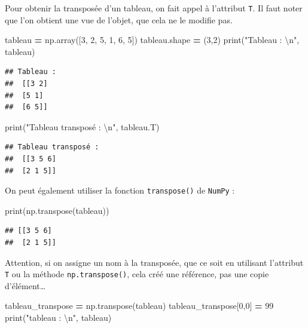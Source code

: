 \documentclass[
  12pt,
]{book}
\newenvironment{Shaded}{\begin{snugshade}}{\end{snugshade}}
\newcommand{\BuiltInTok}[1]{#1}
\newcommand{\CharTok}[1]{\textcolor[rgb]{0.31,0.60,0.02}{#1}}
\newcommand{\DecValTok}[1]{\textcolor[rgb]{0.00,0.00,0.81}{#1}}
\newcommand{\NormalTok}[1]{#1}
\newcommand{\OperatorTok}[1]{\textcolor[rgb]{0.81,0.36,0.00}{\textbf{#1}}}
\newcommand{\StringTok}[1]{\textcolor[rgb]{0.31,0.60,0.02}{#1}}
\numberwithin{equation}{section}
\numberwithin{countremarque}{section}
\begin{document}
Pour obtenir la transposée d'un tableau, on fait appel à l'attribut \texttt{T}. Il faut noter que l'on obtient une vue de l'objet, que cela ne le modifie pas.

\begin{Shaded}
\begin{Highlighting}[]
\NormalTok{tableau }\OperatorTok{=}\NormalTok{ np.array([}\DecValTok{3}\NormalTok{, }\DecValTok{2}\NormalTok{, }\DecValTok{5}\NormalTok{, }\DecValTok{1}\NormalTok{, }\DecValTok{6}\NormalTok{, }\DecValTok{5}\NormalTok{])}
\NormalTok{tableau.shape }\OperatorTok{=}\NormalTok{ (}\DecValTok{3}\NormalTok{,}\DecValTok{2}\NormalTok{)}
\BuiltInTok{print}\NormalTok{(}\StringTok{"Tableau : }\CharTok{\textbackslash{}n}\StringTok{"}\NormalTok{, tableau)}
\end{Highlighting}
\end{Shaded}

\begin{lstlisting}
## Tableau : 
##  [[3 2]
##  [5 1]
##  [6 5]]
\end{lstlisting}

\begin{Shaded}
\begin{Highlighting}[]
\BuiltInTok{print}\NormalTok{(}\StringTok{"Tableau transposé : }\CharTok{\textbackslash{}n}\StringTok{"}\NormalTok{, tableau.T)}
\end{Highlighting}
\end{Shaded}

\begin{lstlisting}
## Tableau transposé : 
##  [[3 5 6]
##  [2 1 5]]
\end{lstlisting}

On peut également utiliser la fonction \texttt{transpose()} de \texttt{NumPy} :

\begin{Shaded}
\begin{Highlighting}[]
\BuiltInTok{print}\NormalTok{(np.transpose(tableau))}
\end{Highlighting}
\end{Shaded}

\begin{lstlisting}
## [[3 5 6]
##  [2 1 5]]
\end{lstlisting}

Attention, si on assigne un nom à la transposée, que ce soit en utilisant l'attribut \texttt{T} ou la méthode \texttt{np.transpose()}, cela créé une référence, pas une copie d'élément\ldots{}

\begin{Shaded}
\begin{Highlighting}[]
\NormalTok{tableau\_transpose }\OperatorTok{=}\NormalTok{ np.transpose(tableau)}
\NormalTok{tableau\_transpose[}\DecValTok{0}\NormalTok{,}\DecValTok{0}\NormalTok{] }\OperatorTok{=} \DecValTok{99}
\BuiltInTok{print}\NormalTok{(}\StringTok{"tableau : }\CharTok{\textbackslash{}n}\StringTok{"}\NormalTok{, tableau)}
\end{Highlighting}
\end{Shaded}
\end{document}
